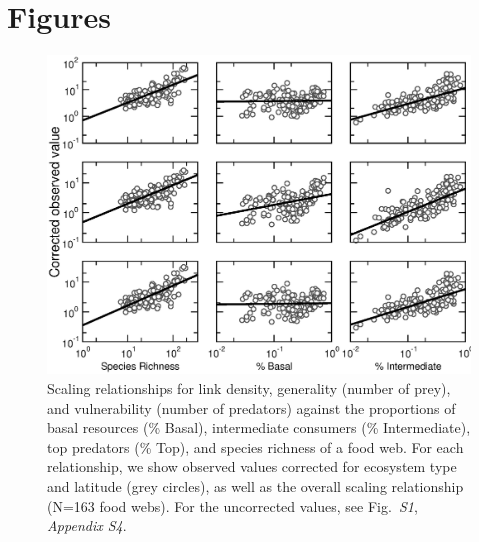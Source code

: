 \documentclass[12pt]{article}
\begin{document}
\section*{Figures}
\begin{figure}[h]
\includegraphics[width=.85\textwidth]{Figures/by_TL/scaling_with_S/proportions/fitlines_nonts.eps}
\caption{Scaling relationships for link density, generality (number of prey), 
and vulnerability (number of predators) 
against the proportions of basal resources (\% Basal), intermediate consumers (\% Intermediate), top 
predators (\% Top), and species richness of a food web. 
For each relationship, we show observed values corrected for
ecosystem type and latitude (grey circles), as well as the overall scaling relationship (N=163 food webs). For
the uncorrected values, see Fig.~\emph{S1}, \emph{Appendix S4}.}
\label{props_v_lat}
\end{figure}


\end{document}
